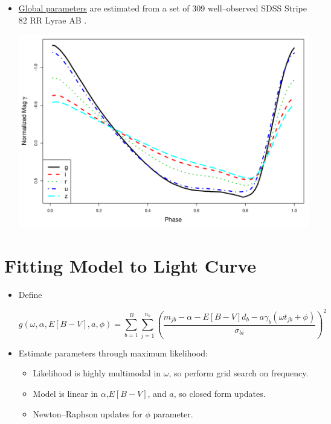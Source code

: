 \documentclass[a0,portrait]{a0poster}
\begin{document}
\begin{multicols}{2}
\begin{itemize}
\item \underline{Global parameters} are estimated from a set of 309 well--observed SDSS Stripe 82 RR Lyrae AB \cite{sesar2010light}. 

\begin{center}\vspace{1cm}
\includegraphics[width=0.7\linewidth]{templates.pdf}
\end{center}\vspace{1cm}


\end{itemize}


\section*{Fitting Model to Light Curve}

\begin{itemize}

\item Define

\begin{equation*}
g(\omega,\alpha,E[B-V],a,\phi) = \sum_{b=1}^B \sum_{j=1}^{n_b}\left(\frac{m_{jb} - \alpha - E[B-V]d_b - a\gamma_b(\omega t_{jb} + \phi)}{\sigma_{bi}}\right)^2
\end{equation*}

\item Estimate parameters through maximum likelihood:
\begin{itemize}
\item Likelihood is highly multimodal in $\omega$, so perform grid search on frequency.
\item Model is linear in $\alpha$,$E[B-V]$, and $a$, so closed form updates.
\item Newton--Raphson updates for $\phi$ parameter.
\end{itemize}


\end{itemize}
\end{multicols}
\end{document}
